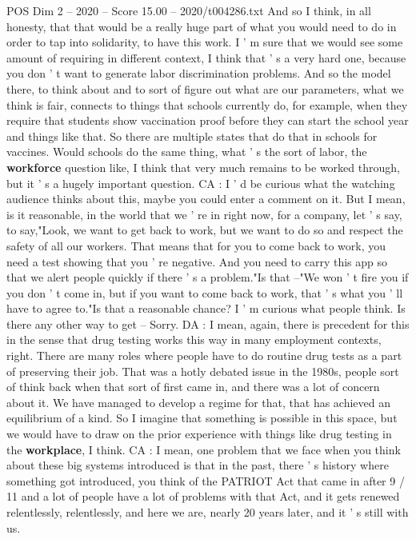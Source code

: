 \begin{textsample}{POS Dim 2 – 2020 – Score 15.00 – 2020/t004286.txt}
And so I think, in all honesty, that that would be a really huge part of what you would need to do in order to tap into solidarity, to have this work.
I ' m sure that we would see some amount of requiring in different context, I think that ' s a very hard one, because you don ' t want to generate labor discrimination problems.
And so the model there, to think about and to sort of figure out what are our parameters, what we think is fair, connects to things that schools currently do, for example, when they require that students show vaccination proof before they can start the school year and things like that.
So there are multiple states that do that in schools for vaccines.
Would schools do the same thing, what ' s the sort of labor, the \textbf{workforce} question like, I think that very much remains to be worked through, but it ' s a hugely important question.
CA : I ' d be curious what the watching audience thinks about this, maybe you could enter a comment on it.
But I mean, is it reasonable, in the world that we ' re in right now, for a company, let ' s say, to say,"Look, we want to get back to work, but we want to do so and respect the safety of all our workers.
That means that for you to come back to work, you need a test showing that you ' re negative.
And you need to carry this app so that we alert people quickly if there ' s a problem."Is that --"We won ' t fire you if you don ' t come in, but if you want to come back to work, that ' s what you ' ll have to agree to."Is that a reasonable chance?
I ' m curious what people think.
Is there any other way to get -- Sorry.
DA : I mean, again, there is precedent for this in the sense that drug testing works this way in many employment contexts, right.
There are many roles where people have to do routine drug tests as a part of preserving their job.
That was a hotly debated issue in the 1980s, people sort of think back when that sort of first came in, and there was a lot of concern about it.
We have managed to develop a regime for that, that has achieved an equilibrium of a kind.
So I imagine that something is possible in this space, but we would have to draw on the prior experience with things like drug testing in the \textbf{workplace}, I think.
CA : I mean, one problem that we face when you think about these big systems introduced is that in the past, there ' s history where something got introduced, you think of the PATRIOT Act that came in after 9 / 11 and a lot of people have a lot of problems with that Act, and it gets renewed relentlessly, relentlessly, and here we are, nearly 20 years later, and it ' s still with us.

\end{textsample}
